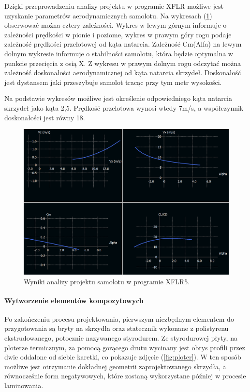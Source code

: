 \documentclass[12pt, a4paper]{article}
\let\oldref\ref
\renewcommand{\ref}[1]{(\oldref{#1})}
\begin{document}
Dzięki przeprowadzeniu analizy projektu w programie XFLR możliwe jest uzyskanie parametrów aerodynamicznych samolotu. Na wykresach \ref{fig:wykresy} obserwować można cztery zależności. Wykres w lewym górnym informuje o zależności prędkości w pionie i poziome, wykres w prawym góry rogu podaje zależność prędkości przelotowej od kąta natarcia. Zależność Cm(Alfa) na lewym dolnym wykresie informuje o stabilności samolotu, która będzie optymalna w punkcie przecięcia z osią X. Z wykresu w prawym dolnym rogu odczytać można zależność doskonałości aerodynamicznej od kąta natarcia skrzydeł. Doskonałość jest dystansem jaki przeszybuje samolot tracąc przy tym metr wysokości. 

Na podstawie wykresów możliwe jest określenie odpowiedniego kąta natarcia skrzydeł jako kąta 2,5\textdegree. Prędkość przelotowa wynosi wtedy 7m/s, a współczynnik doskonałości jest równy 18.

\begin{figure}[ht]
    \centering
    \includegraphics[width=1\textwidth]{wykresy}
    \caption{Wyniki analizy projektu samolotu w programie XFLR5.}
    \label{fig:wykresy}
\end{figure}

\FloatBarrier
\paragraph{Wytworzenie elementów kompozytowych}\mbox{}

Po zakończeniu procesu projektowania, pierwszym niezbędnym elementem do przygotowania są bryty na skrzydła oraz statecznik wykonane z polistyrenu ekstrudowanego, potocznie nazywanego styrodurem. Ze styrodurowej płyty, na ploterze termicznym, za pomocą gorącego drutu wycinany jest obrys profili przez dwie oddalone od siebie karetki, co pokazuje zdjęcie \ref{fig:ploter}. W ten sposób możliwe jest otrzymanie dokładnej geometrii zaprojektowanego skrzydła, a równocześnie form negatywowych, które zostaną wykorzystane później w procesie laminowania.
\end{document}
